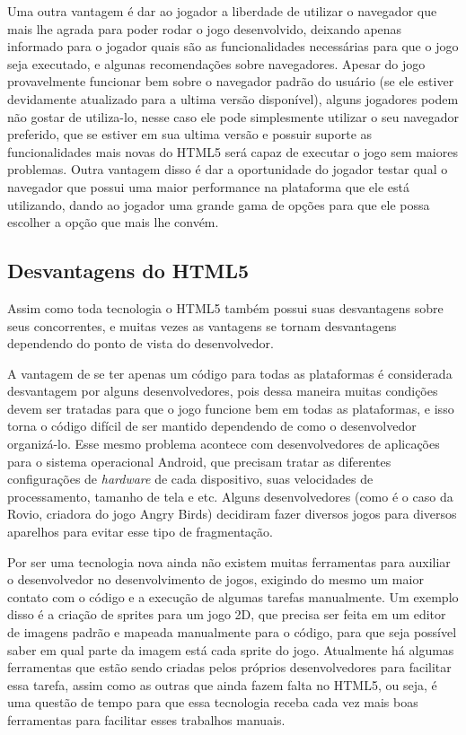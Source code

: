 Uma outra vantagem é dar ao jogador a liberdade de utilizar o
navegador que mais lhe agrada para poder rodar o jogo desenvolvido,
deixando apenas informado para o jogador quais são as funcionalidades
necessárias para que o jogo seja executado, e algunas recomendações
sobre navegadores. Apesar do jogo provavelmente funcionar bem sobre o
navegador padrão do usuário (se ele estiver devidamente atualizado
para a ultima versão disponível), alguns jogadores podem não gostar de
utiliza-lo, nesse caso ele pode simplesmente utilizar
o seu navegador preferido, que se estiver em sua ultima
versão e possuir suporte as funcionalidades mais novas do HTML5 será
capaz de executar o jogo sem maiores problemas. Outra vantagem disso é
dar a oportunidade do jogador testar qual o navegador que possui uma
maior performance na plataforma que ele está utilizando, dando ao
jogador uma grande gama de opções para que ele possa escolher a opção
que mais lhe convém.

\subsection{Desvantagens do HTML5}
Assim como toda tecnologia o HTML5 também possui suas desvantagens
sobre seus concorrentes, e muitas vezes as vantagens se tornam
desvantagens dependendo do ponto de vista do desenvolvedor.

A vantagem de se ter apenas um código para todas as plataformas é
considerada desvantagem por alguns desenvolvedores, pois dessa maneira
muitas condições devem ser tratadas para que o jogo funcione bem em
todas as plataformas, e isso torna o código difícil de ser mantido
dependendo de como o desenvolvedor organizá-lo.
Esse mesmo problema acontece com desenvolvedores de aplicações para o
sistema operacional Android, que precisam tratar as diferentes
configurações de \textit{hardware} de cada dispositivo, suas
velocidades de processamento, tamanho de tela e etc. Alguns
desenvolvedores (como é o caso da Rovio, criadora do jogo Angry Birds)
decidiram fazer diversos jogos para diversos aparelhos para evitar
esse tipo de fragmentação.

Por ser uma tecnologia nova ainda não existem muitas ferramentas para
auxiliar o desenvolvedor no desenvolvimento de jogos, exigindo do
mesmo um maior contato com o código e a execução de algumas tarefas
manualmente. Um exemplo disso é a criação de sprites para um jogo 2D,
que precisa ser feita em um editor de imagens padrão e mapeada
manualmente para o código, para que seja possível saber em qual parte
da imagem está cada sprite do jogo.
Atualmente há algumas ferramentas que estão sendo criadas pelos
próprios desenvolvedores para facilitar essa tarefa, assim como as
outras que ainda fazem falta no HTML5, ou seja, é uma questão de tempo
para que essa tecnologia receba cada vez mais boas ferramentas para
facilitar esses trabalhos manuais.

